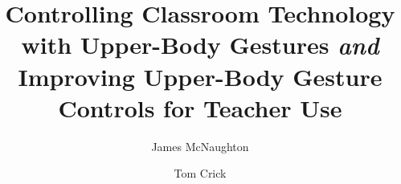 \documentclass[manuscript, review, screen]{acmart}
\begin{document}
\title{Controlling Classroom Technology with Upper-Body Gestures
  {\emph{and}} Improving Upper-Body Gesture Controls for Teacher Use}

\author{James McNaughton}
\author{Tom Crick}

\renewcommand\shortauthors{McNaughton, J. and Crick, T.}

\end{document}
